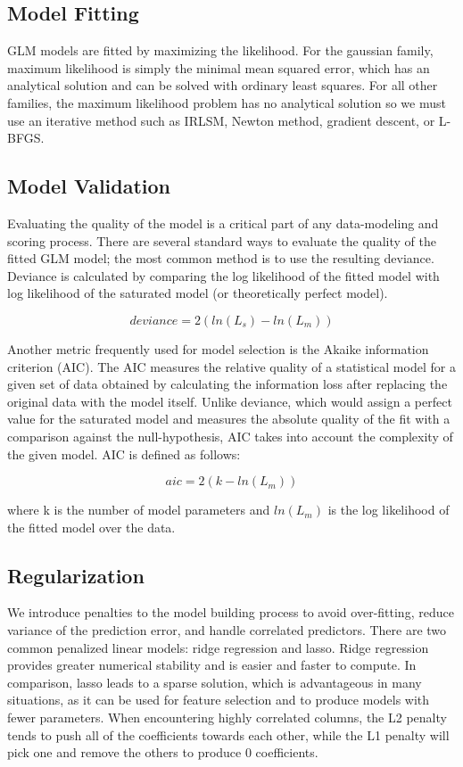 \subsection{Model Fitting}
GLM models are fitted by maximizing the likelihood. For the gaussian family, maximum likelihood is simply the minimal mean squared error, which has an analytical solution and can be solved with ordinary least squares. For all other families, the maximum likelihood problem has no analytical solution so we must use an iterative method such as IRLSM, Newton method, gradient descent, or L-BFGS.

\subsection{Model Validation}
Evaluating the quality of the model is a critical part of any data-modeling and scoring process. There are several standard ways to evaluate the quality of the fitted GLM model; the most common method is to use the resulting deviance. Deviance is calculated by comparing the log likelihood of the fitted model with log likelihood of the saturated model (or theoretically perfect model).

\[ deviance = 2({ln(L_{s})} - {ln(L_{m})}) \]

Another metric frequently used for model selection is the Akaike information criterion (AIC). The AIC measures the relative quality of a statistical model for a given set of data obtained by calculating the information loss after replacing the original data with the model itself. Unlike deviance, which would assign a perfect value for the saturated model and measures the absolute quality of the fit with a comparison against the null-hypothesis, AIC takes into account the complexity of the given model. AIC is defined as follows:

\[ aic = 2(k - ln(L_{m}))\]

where k is the number of model parameters and $ln(L_{m})$ is the log likelihood of the fitted model over the data.


\subsection{Regularization} 
We introduce penalties to the model building process to avoid over-fitting, reduce variance of the prediction error, and handle correlated predictors. There are two common penalized linear models: ridge regression and lasso. Ridge regression provides greater numerical stability and is easier and faster to compute. In comparison, lasso leads to a sparse solution, which is advantageous in many situations, as it can be used for feature selection and to produce models with fewer parameters. When encountering highly correlated columns, the L2 penalty tends to push all of the coefficients towards each other, while the L1 penalty will pick one and remove the others to produce 0 coefficients.

